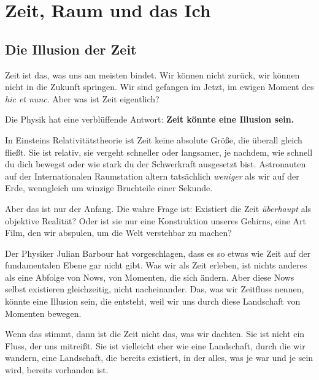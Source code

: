 
\chapter{Zeit, Raum und das Ich}

\section{Die Illusion der Zeit}

Zeit ist das, was uns am meisten bindet. Wir können nicht zurück, wir können nicht in die Zukunft springen. Wir sind gefangen im Jetzt, im ewigen Moment des \emph{hic et nunc}. Aber was ist Zeit eigentlich?

Die Physik hat eine verblüffende Antwort: \textbf{Zeit könnte eine Illusion sein.}

In Einsteins Relativitätstheorie ist Zeit keine absolute Größe, die überall gleich fließt. Sie ist relativ, sie vergeht schneller oder langsamer, je nachdem, wie schnell du dich bewegst oder wie stark du der Schwerkraft ausgesetzt bist. Astronauten auf der Internationalen Raumstation altern tatsächlich \emph{weniger} als wir auf der Erde, wenngleich um winzige Bruchteile einer Sekunde.

Aber das ist nur der Anfang. Die wahre Frage ist: Existiert die Zeit \emph{überhaupt} als objektive Realität? Oder ist sie nur eine Konstruktion unseres Gehirns, eine Art \glqq Film\grqq{}, den wir abspulen, um die Welt verstehbar zu machen?

Der Physiker Julian Barbour hat vorgeschlagen, dass es so etwas wie Zeit auf der fundamentalen Ebene gar nicht gibt. Was wir als Zeit erleben, ist nichts anderes als eine Abfolge von \glqq Nows\grqq{}, von Momenten, die sich ändern. Aber diese \glqq Nows\grqq{} selbst existieren gleichzeitig, nicht nacheinander. Das, was wir \glqq Zeitfluss\grqq{} nennen, könnte eine Illusion sein, die entsteht, weil wir uns durch diese Landschaft von Momenten bewegen.

Wenn das stimmt, dann ist die Zeit nicht das, was wir dachten. Sie ist nicht ein Fluss, der uns mitreißt. Sie ist vielleicht eher wie eine Landschaft, durch die wir wandern, eine Landschaft, die bereits existiert, in der alles, was je war und je sein wird, bereits vorhanden ist.

